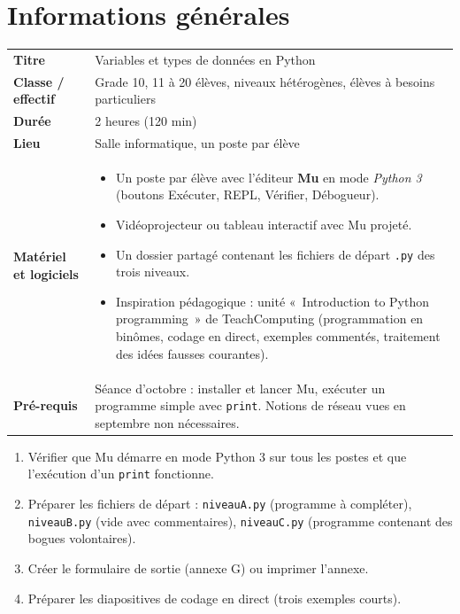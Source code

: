 \documentclass[11pt,a4paper]{article}
\begin{document}

\section{Informations générales}
\begin{tabularx}{\linewidth}{>{\bfseries}p{3.6cm}Y}
\toprule
Titre & Variables et types de données en Python\\
Classe / effectif & Grade 10, 11 à 20 élèves, niveaux hétérogènes, élèves à besoins particuliers\\
Durée & 2 heures (120 min)\\
Lieu & Salle informatique, un poste par élève\\
Matériel et logiciels &
\begin{itemize}
 \item Un poste par élève avec l'éditeur \textbf{Mu} en mode \emph{Python 3} (boutons Exécuter, REPL, Vérifier, Débogueur).
 \item Vidéoprojecteur ou tableau interactif avec Mu projeté.
 \item Un dossier partagé contenant les fichiers de départ \texttt{.py} des trois niveaux.
 \item Inspiration pédagogique : unité «~Introduction to Python programming~» de TeachComputing (programmation en binômes, codage en direct, exemples commentés, traitement des idées fausses courantes).
\end{itemize}\\
Pré-requis &
Séance d'octobre : installer et lancer Mu, exécuter un programme simple avec \texttt{print}. Notions de réseau vues en septembre non nécessaires.\\
\bottomrule
\end{tabularx}

\begin{astuce}
\begin{enumerate}
 \item Vérifier que Mu démarre en mode Python 3 sur tous les postes et que l'exécution d'un \texttt{print} fonctionne.
 \item Préparer les fichiers de départ : \texttt{niveauA.py} (programme à compléter), \texttt{niveauB.py} (vide avec commentaires), \texttt{niveauC.py} (programme contenant des bogues volontaires).
 \item Créer le formulaire de sortie (annexe G) ou imprimer l'annexe.
 \item Préparer les diapositives de codage en direct (trois exemples courts).
\end{enumerate}
\end{astuce}
\end{document}
